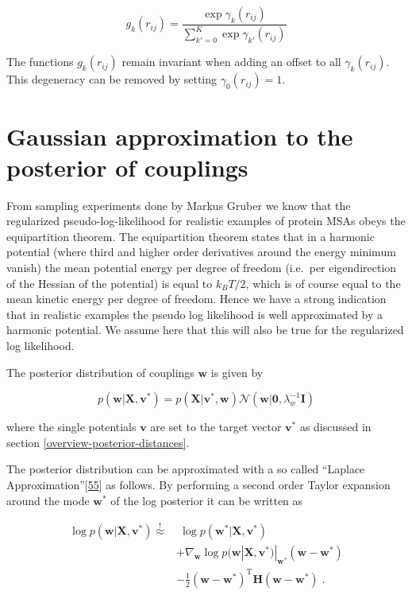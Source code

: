 \documentclass[12pt,a4paper,twoside]{book}
\newcommand{\Gauss}{\mathcal{N}}
\renewcommand{\H}{\mathbf{H}}
\newcommand{\I}{\mathbf{I}}
\newcommand{\rij}{r_{ij}}
\renewcommand{\v}{\mathbf{v}}
\newcommand{\w}{\mathbf{w}}
\newcommand{\X}{\mathbf{X}}
\theoremstyle{definition}
\theoremstyle{definition}
\theoremstyle{remark}
\begin{document}
\begin{equation}
    g_k(\rij) = \frac{\exp \gamma_k(\rij)}{\sum_{k'=0}^K \exp \gamma_{k'}(\rij)} 
\label{eq:def-g-k-binary}
\end{equation}

The functions \(g_k(\rij)\) remain invariant when adding an offset to
all \(\gamma_k(\rij)\). This degeneracy can be removed by setting
\(\gamma_0(\rij)=1\).

\section{Gaussian approximation to the posterior of
couplings}\label{laplace-approx}

From sampling experiments done by Markus Gruber we know that the
regularized pseudo-log-likelihood for realistic examples of protein MSAs
obeys the equipartition theorem. The equipartition theorem states that
in a harmonic potential (where third and higher order derivatives around
the energy minimum vanish) the mean potential energy per degree of
freedom (i.e.~per eigendirection of the Hessian of the potential) is
equal to \(k_B T/2\), which is of course equal to the mean kinetic
energy per degree of freedom. Hence we have a strong indication that in
realistic examples the pseudo log likelihood is well approximated by a
harmonic potential. We assume here that this will also be true for the
regularized log likelihood.

The posterior distribution of couplings \(\w\) is given by

\begin{equation}
p(\w | \X , \v^*) = p(\X | \v^*, \w) \Gauss (\w | \mathbf{0}, \lambda_w^{-1} \I)
\end{equation}

where the single potentials \(\v\) are set to the target vector \(\v^*\)
as discussed in section \ref{overview-posterior-distances}.

The posterior distribution can be approximated with a so called
``Laplace Approximation''{[}\protect\hyperlink{ref-Murphy2012}{55}{]} as
follows. By performing a second order Taylor expansion around the mode
\(\w^*\) of the log posterior it can be written as

\begin{align}
    \log p(\w | \X , \v^*) \overset{!}{\approx} &  \;  \log p(\w^* | \X , \v^*) \\
                & + \nabla_\w \log p(\w | \X , \v^*)|_{\w^*}(\w-\w^*) \\ 
                & - \frac{1}{2} (\w-\w^*)^{\mathrm{T}} \H (\w-\w^*)  \; .
\end{align}
\end{document}
